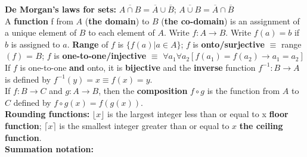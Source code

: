 \documentclass[12pt]{article}
\newcommand{\floor}[1][x]{\lfloor #1\rfloor}
\newcommand{\ceil}[1][x]{\lceil #1\rceil}
\begin{document}
\textbf{De Morgan's laws for sets:} $\overline{A \cap B} = \overline{A} \cup \overline{B}$; $\overline{A \cup B} = \overline{A} \cap \overline{B}$ \\
A \textbf{function} f from $A$ (\textbf{the domain}) to $B$ (\textbf{the co-domain}) is an assignment of a unique element of $B$ to each element of $A$. Write $f: A \rightarrow B$. Write $f(a) = b$ if $b$ is assigned to $a$. \textbf{Range} of $f$ is $\{ f(a) | a \in A\}$; $f$ is \textbf{onto/surjective} $\equiv$ range $(f)$ = $B$; $f$ is \textbf{one-to-one/injective} $\equiv$ $\forall a_1 \forall a_2 [f(a_1) = f(a_2) \rightarrow a_1 = a_2]$ \\
If $f$ is one-to-one \textbf{and} onto, it is \textbf{bijective} and the \textbf{inverse} function $f^{-1} : B \rightarrow A$ is defined by $f^{-1}(y) = x \equiv f(x) = y$. \\
If $f : B \rightarrow C$ and $g : A \rightarrow B$, then the \textbf{composition} $f \circ g$ is the function from $A$ to $C$ defined by $f \circ g(x) = f(g(x))$. \\
\textbf{Rounding functions:} $\floor{}$ is the largest integer less than or equal to x \textbf{floor function}; $\ceil{}$ is the smallest integer greater than or equal to $x$ \textbf{the ceiling function}. \\
\textbf{Summation notation:}
\end{document}

